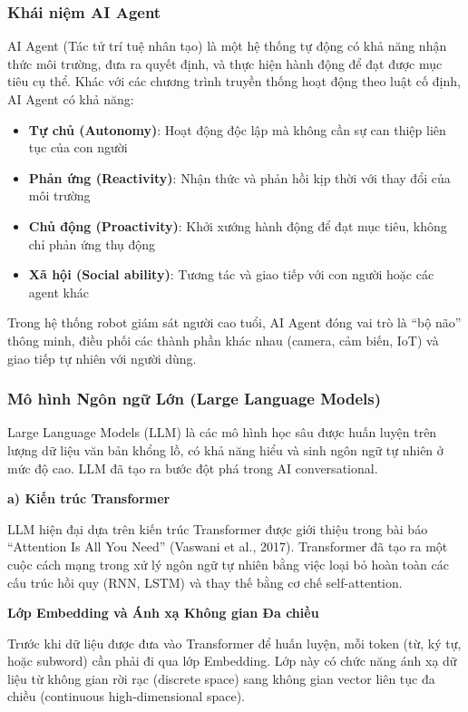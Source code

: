\subsubsection{Khái niệm AI Agent}

AI Agent (Tác tử trí tuệ nhân tạo) là một hệ thống tự động có khả năng nhận thức môi trường, đưa ra quyết định, và thực hiện hành động để đạt được mục tiêu cụ thể. Khác với các chương trình truyền thống hoạt động theo luật cố định, AI Agent có khả năng:

\begin{itemize}
    \item \textbf{Tự chủ (Autonomy)}: Hoạt động độc lập mà không cần sự can thiệp liên tục của con người
    \item \textbf{Phản ứng (Reactivity)}: Nhận thức và phản hồi kịp thời với thay đổi của môi trường
    \item \textbf{Chủ động (Proactivity)}: Khởi xướng hành động để đạt mục tiêu, không chỉ phản ứng thụ động
    \item \textbf{Xã hội (Social ability)}: Tương tác và giao tiếp với con người hoặc các agent khác
\end{itemize}

Trong hệ thống robot giám sát người cao tuổi, AI Agent đóng vai trò là ``bộ não'' thông minh, điều phối các thành phần khác nhau (camera, cảm biến, IoT) và giao tiếp tự nhiên với người dùng.

\subsubsection{Mô hình Ngôn ngữ Lớn (Large Language Models)}

Large Language Models (LLM) là các mô hình học sâu được huấn luyện trên lượng dữ liệu văn bản khổng lồ, có khả năng hiểu và sinh ngôn ngữ tự nhiên ở mức độ cao. LLM đã tạo ra bước đột phá trong AI conversational.

\textbf{a) Kiến trúc Transformer}

LLM hiện đại dựa trên kiến trúc Transformer được giới thiệu trong bài báo ``Attention Is All You Need'' (Vaswani et al., 2017). Transformer đã tạo ra một cuộc cách mạng trong xử lý ngôn ngữ tự nhiên bằng việc loại bỏ hoàn toàn các cấu trúc hồi quy (RNN, LSTM) và thay thế bằng cơ chế self-attention.

\textbf{Lớp Embedding và Ánh xạ Không gian Đa chiều}

Trước khi dữ liệu được đưa vào Transformer để huấn luyện, mỗi token (từ, ký tự, hoặc subword) cần phải đi qua lớp Embedding. Lớp này có chức năng ánh xạ dữ liệu từ không gian rời rạc (discrete space) sang không gian vector liên tục đa chiều (continuous high-dimensional space).

